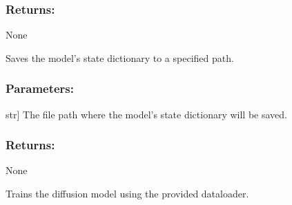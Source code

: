 \documentclass[a4paper,10pt,english]{sphinxmanual}
\begin{document}
\begin{fulllineitems}
\begin{fulllineitems}
\begin{description}
\end{description}


\subsubsection{Returns:}
\label{\detokenize{models:id23}}
\sphinxAtStartPar
None

\end{fulllineitems}


\begin{fulllineitems}
\label{\detokenize{models:fireDiff.Models.diffusionmodel.DiffusionModel.save_model}}
\pysigstartsignatures
{}
\pysigstopsignatures
\sphinxAtStartPar
Saves the model’s state dictionary to a specified path.


\subsubsection{Parameters:}
\label{\detokenize{models:id24}}\begin{description}
\sphinxlineitem{path}{[}str{]}
\sphinxAtStartPar
The file path where the model’s state dictionary will be saved.

\end{description}


\subsubsection{Returns:}
\label{\detokenize{models:id25}}
\sphinxAtStartPar
None

\end{fulllineitems}


\begin{fulllineitems}
\label{\detokenize{models:fireDiff.Models.diffusionmodel.DiffusionModel.train_model}}
\pysigstartsignatures
{}
\pysigstopsignatures
\sphinxAtStartPar
Trains the diffusion model using the provided dataloader.



\end{fulllineitems}
\end{fulllineitems}
\end{document}
